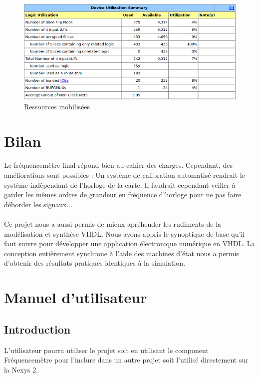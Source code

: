 \documentclass[a4paper,11pt]{article}
\begin{document}
\begin{figure}[H]
\begin{center}
	\includegraphics[scale=.5]{summary.png}
	\caption{Ressources mobilisées}
\end{center}
\end{figure}



\newpage
\section{Bilan}

\paragraph{} Le fréquencemètre final répond bien au cahier des charges. Cependant, des améliorations sont possibles :
Un système de calibration automatisé rendrait le système indépendant de l'horloge de la carte. 
Il faudrait cependant veiller à garder les mêmes ordres de grandeur en fréquence d'horloge pour ne pas 
faire déborder les signaux...



\paragraph{} Ce projet nous a aussi permis de mieux apréhender les rudiments de la modélisation et synthèse VHDL.
Nous avons appris le synoptique de base qu'il faut suivre pour développer une application électronique numérique en VHDL.
La conception entièrement synchrone à l'aide des machines d'état nous a permis d'obtenir des résultats pratiques identiques 
à la simulation.

\newpage
\appendix
\section{Manuel d'utilisateur}
\subsection{Introduction}
L'utilisateur pourra utiliser le projet soit en utilisant le component Fréquencemètre pour l'inclure dans un autre projet soit l'utilisé directement sur la Nexys 2.
\end{document}
